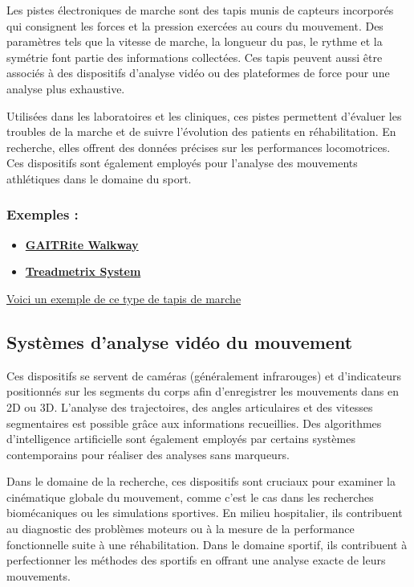 Les pistes électroniques de marche sont des tapis munis de capteurs incorporés qui consignent les forces et la pression exercées au cours du mouvement.
Des paramètres tels que la vitesse de marche, la longueur du pas, le rythme et la symétrie font partie des informations collectées. 
Ces tapis peuvent aussi être associés à des dispositifs d'analyse vidéo ou des plateformes de force pour une analyse plus exhaustive.

Utilisées dans les laboratoires et les cliniques, ces pistes permettent d'évaluer les troubles de la marche et de suivre l'évolution des patients en réhabilitation. 
En recherche, elles offrent des données précises sur les performances locomotrices. 
Ces dispositifs sont également employés pour l'analyse des mouvements athlétiques dans le domaine du sport.

\subsubsection{Exemples :}
\begin{itemize}
  \item \href{https://www.gaitrite.com/}{\textbf{GAITRite Walkway}}
  \item \href{https://www.treadmetrix.com/}{\textbf{Treadmetrix System}}
\end{itemize}

\href{https://www.gaitrite.com/}{Voici un exemple de ce type de tapis de marche}

\subsection{Systèmes d’analyse vidéo du mouvement}

Ces dispositifs se servent de caméras (généralement infrarouges) et d'indicateurs positionnés sur les segments du corps afin d'enregistrer les mouvements dans en 2D ou 3D. 
L'analyse des trajectoires, des angles articulaires et des vitesses segmentaires est possible grâce aux informations recueillies. 
Des algorithmes d'intelligence artificielle sont également employés par certains systèmes contemporains pour réaliser des analyses sans marqueurs.

Dans le domaine de la recherche, ces dispositifs sont cruciaux pour examiner la cinématique globale du mouvement, comme c'est le cas dans les recherches biomécaniques ou les simulations sportives. 
En milieu hospitalier, ils contribuent au diagnostic des problèmes moteurs ou à la mesure de la performance fonctionnelle suite à une réhabilitation. 
Dans le domaine sportif, ils contribuent à perfectionner les méthodes des sportifs en offrant une analyse exacte de leurs mouvements.

